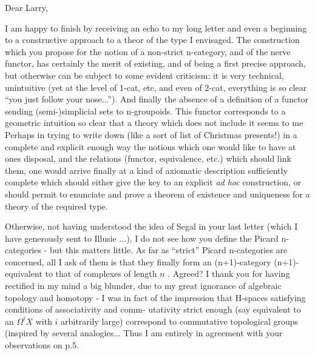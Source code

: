 

Dear Larry,

I am happy to finish by receiving an echo to my long letter and even a
beginning to a constructive approach to a theor of the type I envisaged.
The construction which you propose for the notion of a non-strict n-category,
and of the nerve functor, has certainly the merit of existing, and of being
a first precise approach, but otherwise can be subject to some evident
criticism: it is very technical, unintuitive (yet at the level of 1-cat, etc,
and even of 2-cat, everything is so clear\hand{\unsure{-}} ``you just follow your nose...'').
And finally the absence of a definition of a functor sending (semi-)simplicial
sets to n-groupoids. This functor corresponds to a geometric intuition so
clear that a theory which does not include it seems to me   Perhaps
in trying to write down (like a sort of list of Christmas presents!) in a
complete and explicit enough way the notions which one would like to have at
ones disposal, and the relations (functor, equivalence, etc.) which should link
them, one would arrive finally at a kind of axiomatic description sufficiently
complete which should either give the key to an explicit \textit{ad hoc} construction,
or should permit   to enunciate and prove a theorem of existence and
uniqueness  for a theory of the required type. \margin{$\times$}

Otherwise, not having understood the idea of Segal in your last letter
(which I have generously sent to Illusie ...), I do not see how you define
the Picard n-categories - but this matters little. As far as ``strict'' Picard
n-categories are concerned, all I ask of them is that they finally form an
(n+1)-category (n+1)-equivalent to that of  complexes  of length $n$ .
Agreed? I thank you for having rectified in my mind a big blunder, due to
my great ignorance of algebraic topology and homotopy - I was in fact of the
impression that H-spaces satisfying conditions of associativity and comm-%
utativity strict enough (say equivalent to an $\Omega^{i}X$ with $i$ arbitrarily large)
correspond to commutative topological groups (inspired by several analogies...\hand{)}
Thus I am entirely in agreement with your observations on p.5.

